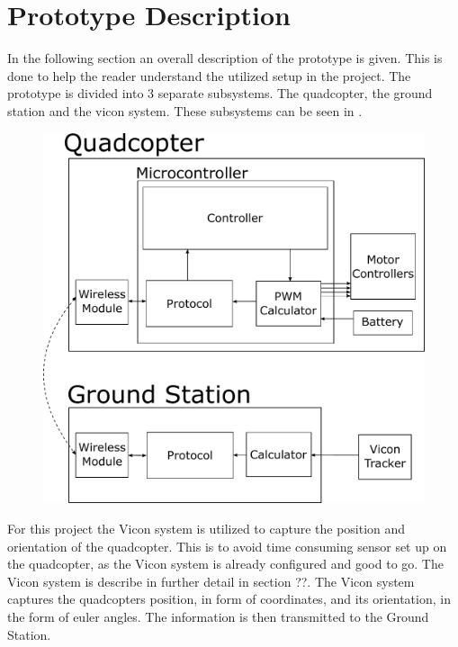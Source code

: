 \section{Prototype Description}
In the following section an overall description of the prototype is given. This is done to help the reader understand the utilized setup in the project.
The prototype is divided into 3 separate subsystems. The quadcopter, the ground station and the vicon system. These subsystems can be seen in . 

\begin{figure}[H] 
	\includegraphics[scale=.5]{figures/prototypediagram}
	\centering
	\captionsetup{justification=centering}
	\label{prototypediagram}
\end{figure}


For this project the Vicon system is utilized to capture the position and orientation of the quadcopter. This is to avoid time consuming sensor set up on the quadcopter, as the Vicon system is already configured and good to go. The Vicon system is describe in further detail in section ??. The Vicon system captures the quadcopters position, in form of coordinates, and its orientation, in the form of euler angles. The information is then transmitted to the Ground Station.

